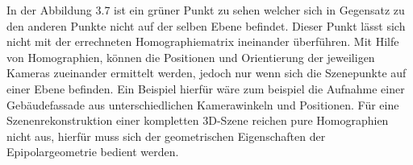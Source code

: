 In der Abbildung 3.7 ist ein grüner Punkt zu sehen welcher sich in Gegensatz zu den anderen Punkte nicht auf der selben Ebene befindet. Dieser Punkt lässt sich nicht mit der errechneten Homographiematrix ineinander überführen. Mit Hilfe von Homographien, können die Positionen und Orientierung der jeweiligen Kameras zueinander ermittelt werden, jedoch nur wenn sich die Szenepunkte auf einer Ebene befinden. Ein Beispiel hierfür wäre zum beispiel die Aufnahme einer Gebäudefassade aus unterschiedlichen Kamerawinkeln und Positionen\cite{Elements}. Für eine Szenenrekonstruktion einer kompletten 3D-Szene reichen pure Homographien nicht aus, hierfür muss sich der geometrischen Eigenschaften der Epipolargeometrie bedient werden. 



%
%
%
%
%
%
%
%
